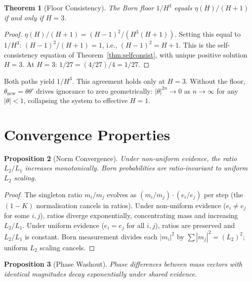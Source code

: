 \documentclass[11pt,a4paper]{article}
\newtheorem{theorem}{Theorem}[section]
\newtheorem{proposition}[theorem]{Proposition}
\theoremstyle{definition}
\theoremstyle{remark}
\begin{document}
\begin{theorem}[Floor Consistency]\label{thm:floorconsist}
The Born floor $1/H^3$ equals $\eta(H)/(H+1)$ if and only if $H=3$.
\end{theorem}

\begin{proof}
$\eta(H)/(H+1)=(H-1)^2/(H^3(H+1))$. Setting this equal to $1/H^3$: $(H-1)^2/(H+1)=1$, i.e., $(H-1)^2=H+1$. This is the self-consistency equation of Theorem~\ref{thm:selfconsist}, with unique positive solution $H=3$. At $H=3$: $1/27=(4/27)/4=1/27$.
\end{proof}

Both paths yield $1/H^3$. This agreement holds only at $H=3$. Without the floor, $\theta_{\mathrm{new}}=\theta\theta'$ drives ignorance to zero geometrically: $|\theta|^{2n}\to 0$ as $n\to\infty$ for any $|\theta|<1$, collapsing the system to effective $H=1$.


\section{Convergence Properties}\label{sec:convergence}

\begin{proposition}[Norm Convergence]\label{prop:norm}
Under non-uniform evidence, the ratio $L_2/L_1$ increases monotonically. Born probabilities are ratio-invariant to uniform $L_2$ scaling.
\end{proposition}

\begin{proof}
The singleton ratio $m_i/m_j$ evolves as $(m_i/m_j)\cdot(e_i/e_j)$ per step (the $(1-K)$ normalisation cancels in ratios). Under non-uniform evidence ($e_i\neq e_j$ for some $i,j$), ratios diverge exponentially, concentrating mass and increasing $L_2/L_1$. Under uniform evidence ($e_i=e_j$ for all $i,j$), ratios are preserved and $L_2/L_1$ is constant. Born measurement divides each $|m_i|^2$ by $\sum|m_j|^2=(L_2)^2$; uniform $L_2$ scaling cancels.
\end{proof}

\begin{proposition}[Phase Washout]\label{prop:washout}
Phase differences between mass vectors with identical magnitudes decay exponentially under shared evidence.
\end{proposition}
\end{document}
